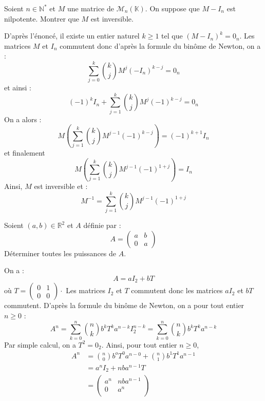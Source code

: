 \documentclass[a4paper,10pt]{report}
\begin{document}
\begin{Exa} Soient $n \in \mathbb{N}^*$ et $M$ une matrice de $\mathcal{M}_n(\mathbb{K})$. On suppose que $M-I_n$ est nilpotente. Montrer que $M$ est inversible.
\end{Exa} 

\corr D'après l'énoncé, il existe un entier naturel $k \geq 1$ tel que $(M-I_n)^k = 0_n$. Les matrices $M$ et $I_n$ commutent donc d'après la formule du binôme de Newton, on a :
$$ \sum_{j=0}^k \binom{k}{j} M^j (-I_n)^{k-j} = 0_n$$
et ainsi :
$$ (-1)^k I_n + \sum_{j=1}^k \binom{k}{j} M^j (-1)^{k-j} = 0_n$$
On a alors :
$$ M \left(\sum_{j=1}^k \binom{k}{j} M^{j-1} (-1)^{k-j} \right) = (-1)^{k+1} I_n$$
et finalement 
$$ M \left(\sum_{j=1}^k \binom{k}{j} M^{j-1} (-1)^{1+j} \right)= I_n$$
Ainsi, $M$ est inversible et :
$$ M^{-1} = \sum_{j=1}^k \binom{k}{j} M^{j-1} (-1)^{1+j} $$

\medskip

\begin{Exa} Soient $(a,b) \in \mathbb{R}^2$ et $A$ définie par :
$$ A = \begin{pmatrix}
a & b \\
0  & a
\end{pmatrix}$$ 
Déterminer toutes les puissances de $A$.
\end{Exa}

\corr On a :
$$ A = a I_2 + b T$$
où $T = \begin{pmatrix}
0 & 1 \\
0 & 0
\end{pmatrix} \cdot$ Les matrices $I_2$ et $T$ commutent donc les matrices $a I_2$ et $bT$ commutent. D'après la formule du binôme de Newton, on a pour tout entier $n \geq 0$ :
$$ A^n = \sum_{k=0}^n \binom{n}{k} b^k T^k a^{n-k} I_2^{n-k} = \sum_{k=0}^n \binom{n}{k} b^k T^k a^{n-k} $$
Par simple calcul, on a $T^2 = 0_2$. Ainsi, pour tout entier $n \geq 0$,
\begin{align*}
 A^n  &= \binom{n}{0} b^o T^0 a^{n-0} + \binom{n}{1} b^1 T^1 a^{n-1} \\
 & = a^n I_2 + nba^{n-1} T \\
 & = \begin{pmatrix}
 a^n & nba^{n-1} \\
 0 & a^n \\
 \end{pmatrix}
 \end{align*}
%
%
\end{document}
